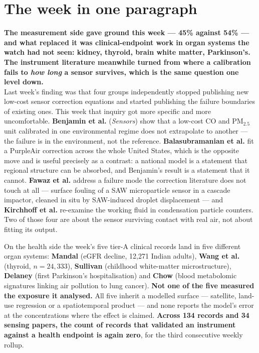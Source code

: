 \documentclass[10pt]{article}
\begin{document}
\vspace{6mm}

\section*{\sffamily\bfseries\color{Deep}The week in one paragraph}
\vspace{-1.5mm}{\color{Teal}\rule{\linewidth}{1.1pt}}\vspace{2.5mm}

\begin{keybox}
{\sffamily\bfseries\small\color{Deep}The measurement side gave ground this week --- 45\%
against 54\% --- and what replaced it was clinical-endpoint work in organ systems the
watch had not seen: kidney, thyroid, brain white matter, Parkinson's. The instrument
literature meanwhile turned from where a calibration fails to \emph{how long} a sensor
survives, which is the same question one level down.}\\[1.4mm]
\footnotesize
Last week's finding was that four groups independently stopped publishing new low-cost
sensor correction equations and started publishing the failure boundaries of existing
ones. This week that inquiry got more specific and more uncomfortable.
\textbf{Benjamin et al.} (\textit{Sensors}) show that a low-cost CO and PM$_{2.5}$ unit
calibrated in one environmental regime does not extrapolate to another --- the failure is
in the environment, not the reference. \textbf{Balasubramanian et al.} fit a
PurpleAir correction across the whole United States, which is the opposite move and is
useful precisely as a contrast: a national model is a statement that regional structure
can be absorbed, and Benjamin's result is a statement that it cannot.
\textbf{Fawaz et al.} address a failure mode the correction literature does not touch at
all --- surface fouling of a SAW microparticle sensor in a cascade impactor, cleaned in
situ by SAW-induced droplet displacement --- and \textbf{Kirchhoff et al.} re-examine the
working fluid in condensation particle counters. Two of those four are about the sensor
surviving contact with real air, not about fitting its output.

On the health side the week's five tier-A clinical records land in five different organ
systems: \textbf{Mandal} (eGFR decline, 12{,}271 Indian adults), \textbf{Wang et al.}
(thyroid, $n=24{,}333$), \textbf{Sullivan} (childhood white-matter microstructure),
\textbf{Delaney} (first Parkinson's hospitalisation) and \textbf{Chow} (blood metabolomic
signatures linking air pollution to lung cancer). \textbf{Not one of the five measured the
exposure it analysed.} All five inherit a modelled surface --- satellite, land-use
regression or a spatiotemporal product --- and none reports the model's error at the
concentrations where the effect is claimed. \textbf{Across 134 records and 34 sensing
papers, the count of records that validated an instrument against a health endpoint is
again zero}, for the third consecutive weekly rollup.
\end{keybox}
\end{document}
